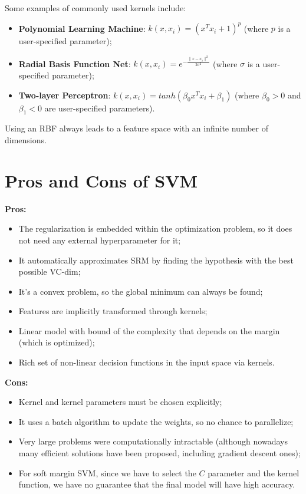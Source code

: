 Some examples of commonly used kernels include:
\begin{itemize}
    \item \textbf{Polynomial Learning Machine}: $k(x,x_i) = (x^T x_i + 1)^p$ (where $p$ is a user-specified parameter);
    \item \textbf{Radial Basis Function Net}: $k(x, x_i) = e^{-\frac{\|x - x_i\|^2}{2 \sigma^2}}$ (where $\sigma$ is a user-specified parameter);
    \item \textbf{Two-layer Perceptron}: $k(x,x_i) = tanh(\beta_0 x^T x_i + \beta_1)$ (where $\beta_0 > 0$ and $\beta_1 < 0$ are user-specified parameters).
\end{itemize}
Using an RBF always leads to a feature space with an infinite number of dimensions.

\section{Pros and Cons of SVM}

\textbf{Pros:}
\begin{itemize}
    \item The regularization is embedded within the optimization problem, so it does not need any external hyperparameter for it;
    \item It automatically approximates SRM by finding the hypothesis with the best possible VC-dim;
    \item It's a convex problem, so the global minimum can always be found;
    \item Features are implicitly transformed through kernels;
    \item Linear model with bound of the  complexity that depends on the margin (which is optimized);
    \item Rich set of non-linear decision functions in the input space via kernels.
\end{itemize}

\textbf{Cons:}
\begin{itemize}
    \item Kernel and kernel parameters must be chosen explicitly;
    \item It uses a batch algorithm to update the weights, so no chance to parallelize;
    \item Very large problems were computationally intractable (although nowadays many efficient solutions have been proposed, including gradient descent ones);
    \item For soft margin SVM, since we have to select the $C$ parameter and the kernel function, we have no guarantee that the final model will have high accuracy.
\end{itemize}

